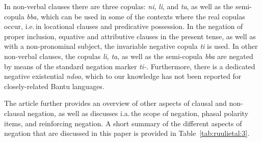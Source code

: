 \documentclass[output=paper,colorlinks,citecolor=brown,draftmode]{langscibook}
\begin{document}
In non-verbal clauses there are three copulas: \textit{ni}, \textit{li}, and \textit{ta}, as well as the semi-copula \textit{bba}, which can be used in some of the contexts where the real copulas occur, i.e.\,in locational clauses and predicative possession.
In the negation of proper inclusion, equative and attributive clauses in the present tense, as well as with a non-pronominal subject, the invariable negative copula \emph{ti} is used. 
In other non-verbal clauses, the copulas \textit{li}, \textit{ta}, as well as the semi-copula \textit{bba} are negated by means of the standard negation marker \textit{ti-}. 
Furthermore, there is a dedicated negative existential \textit{ndoo}, which to our knowledge has not been reported for closely-related Bantu languages. 

The article further provides an overview of other aspects of clausal and non-clausal negation, as well as discusses i.a.\,the scope of negation, phasal polarity items, and reinforcing negation. 
A short summary of the different aspects of negation that are discussed in this paper is provided in Table~\ref{tab:ruulietal:3}.
\end{document}
